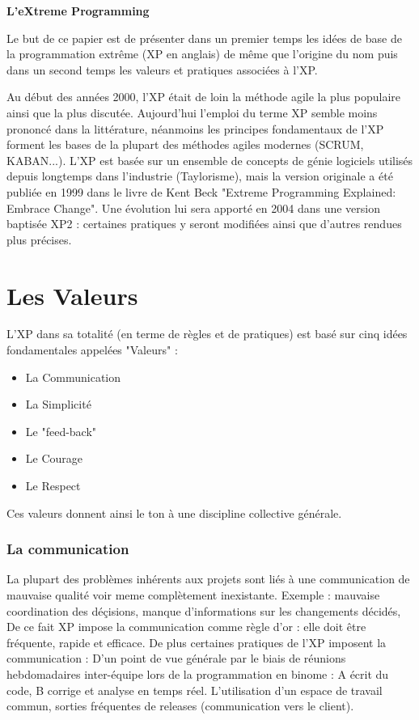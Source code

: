 \documentclass[a4paper,oneside,11pt]{report}
\begin{document}
\pagestyle{plain}
\vspace{2ex}%
\begin{center}
\bfseries\Huge{L'eXtreme Programming}
\end{center}
\vspace{3ex}%

Le but de ce papier est de présenter dans un premier temps les idées de base de la programmation extrême (XP en anglais) de même que l'origine du nom puis dans un second temps les valeurs et pratiques associées à l'XP.

Au début des années 2000, l'XP était de loin la méthode agile la plus populaire ainsi que la plus discutée. Aujourd'hui l'emploi du terme XP semble moins prononcé dans la littérature, néanmoins les principes fondamentaux de l'XP forment les bases de la plupart des méthodes agiles modernes (SCRUM, KABAN...). L'XP est basée sur un ensemble de concepts de génie logiciels utilisés depuis longtemps dans l'industrie (Taylorisme), mais la version originale a été publiée en 1999 dans le livre de Kent Beck "Extreme Programming Explained: Embrace Change". Une évolution lui sera apporté en 2004 dans une version baptisée XP2 : certaines pratiques y seront modifiées ainsi que d'autres rendues plus précises. \\

\section{Les Valeurs}
L'XP dans sa totalité (en terme de règles et de pratiques) est basé sur cinq idées fondamentales appelées "Valeurs" :
\begin{itemize}
\item La Communication
\item La Simplicité
\item Le "feed-back"
\item Le Courage
\item Le Respect
\end{itemize}

Ces valeurs donnent ainsi le ton à une discipline collective générale.

\subsubsection{La communication}

La plupart des problèmes inhérents aux projets sont liés à une communication de mauvaise qualité voir meme complètement inexistante. Exemple : mauvaise coordination des déçisions, manque d'informations sur les changements décidés, 
De ce fait XP impose la communication comme règle d'or : elle doit être fréquente, rapide et efficace. De plus certaines pratiques de l'XP imposent la communication : 
D'un point de vue générale par le biais de réunions hebdomadaires inter-équipe
lors de la programmation en binome : A écrit du code, B corrige et analyse en temps réel. 
L'utilisation d'un espace de travail commun,  sorties fréquentes de releases (communication vers le client).
\end{document}
